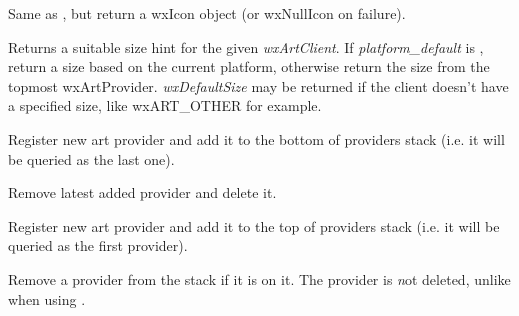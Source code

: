 
Same as , but
return a wxIcon object (or wxNullIcon on failure).


Returns a suitable size hint for the given {\it wxArtClient}. If 
{\it platform\_default} is \true, return a size based on the current platform, 
otherwise return the size from the topmost wxArtProvider. {\it wxDefaultSize} may be 
returned if the client doesn't have a specified size, like wxART\_OTHER for example.


\label{wxartproviderinsert}


Register new art provider and add it to the bottom of providers stack (i.e.
it will be queried as the last one).




\label{wxartproviderctor}


Remove latest added provider and delete it.


\label{wxartproviderpush}


Register new art provider and add it to the top of providers stack (i.e. it
will be queried as the first provider).




\label{wxartproviderremove}


Remove a provider from the stack if it is on it. The provider is {\emph not} 
deleted, unlike when using .

